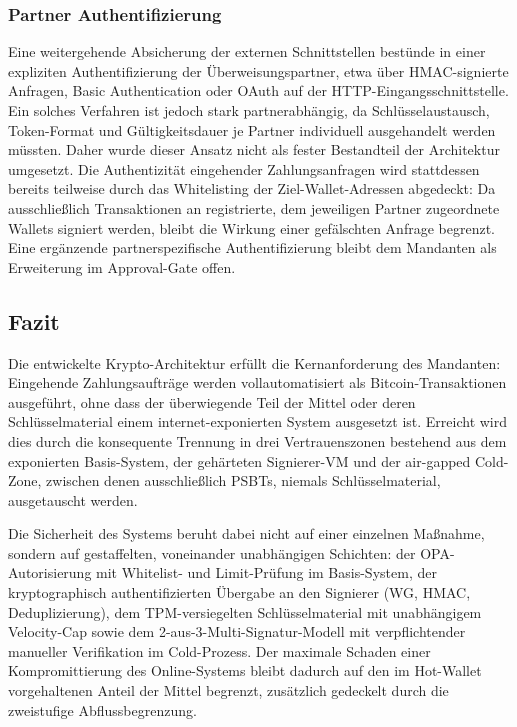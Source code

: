 \subsubsection{Partner Authentifizierung} \label{sec:partner_auth}
Eine weitergehende Absicherung der externen Schnittstellen bestünde in einer expliziten Authentifizierung der Überweisungspartner, etwa über \ac{HMAC}-signierte Anfragen, Basic Authentication oder OAuth auf der \ac{HTTP}-Eingangsschnittstelle. Ein solches Verfahren ist jedoch stark partnerabhängig, da Schlüsselaustausch, Token-Format und Gültigkeitsdauer je Partner individuell ausgehandelt werden müssten. Daher wurde dieser Ansatz nicht als fester Bestandteil der Architektur umgesetzt. 
Die Authentizität eingehender Zahlungsanfragen wird stattdessen bereits teilweise durch das Whitelisting der Ziel-Wallet-Adressen abgedeckt: Da ausschließlich Transaktionen an registrierte, dem jeweiligen Partner zugeordnete Wallets signiert werden, bleibt die Wirkung einer gefälschten Anfrage begrenzt. Eine ergänzende partnerspezifische Authentifizierung bleibt dem Mandanten als Erweiterung im Approval-Gate offen.


\subsection{Fazit}

Die entwickelte Krypto-Architektur erfüllt die Kernanforderung des Mandanten:
Eingehende Zahlungsaufträge werden vollautomatisiert als Bitcoin-Transaktionen ausgeführt, ohne dass der überwiegende Teil der Mittel oder deren Schlüsselmaterial einem internet-exponierten System ausgesetzt ist. Erreicht wird dies durch die konsequente Trennung in drei Vertrauenszonen bestehend aus dem exponierten Basis-System, der gehärteten Signierer-\ac{VM} und der air-gapped Cold-Zone, zwischen denen ausschließlich \acp{PSBT}, niemals Schlüsselmaterial, ausgetauscht werden.

Die Sicherheit des Systems beruht dabei nicht auf einer einzelnen Maßnahme, sondern auf gestaffelten, voneinander unabhängigen Schichten: der \ac{OPA}-Autorisierung mit Whitelist- und Limit-Prüfung im Basis-System, der kryptographisch authentifizierten Übergabe an den Signierer (\ac{WG}, \ac{HMAC}, Deduplizierung), dem \ac{TPM}-versiegelten Schlüsselmaterial mit unabhängigem Velocity-Cap sowie dem 2-aus-3-Multi-Signatur-Modell mit verpflichtender manueller Verifikation im Cold-Prozess. 
Der maximale Schaden einer Kompromittierung des Online-Systems bleibt dadurch auf den im Hot-Wallet vorgehaltenen Anteil der Mittel begrenzt, zusätzlich gedeckelt durch die zweistufige Abflussbegrenzung.

